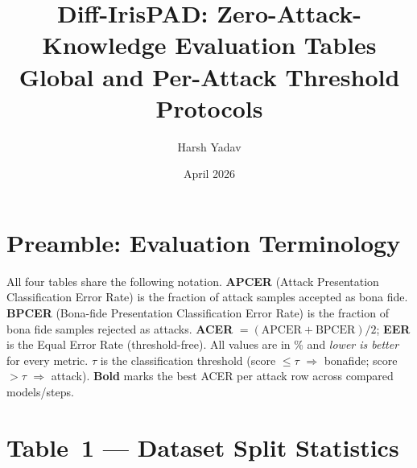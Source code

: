 \documentclass{article}
\title{\textbf{Diff-IrisPAD: Zero-Attack-Knowledge Evaluation Tables}\\
       \large Global and Per-Attack Threshold Protocols}
\author{Harsh Yadav}
\date{April 2026}
\begin{document}
\maketitle

\section*{Preamble: Evaluation Terminology}

\noindent
All four tables share the following notation.
\textbf{APCER} (Attack Presentation Classification Error Rate) is the fraction
of attack samples accepted as bona fide.
\textbf{BPCER} (Bona-fide Presentation Classification Error Rate) is the
fraction of bona fide samples rejected as attacks.
\textbf{ACER} $=(\text{APCER}+\text{BPCER})/2$;
\textbf{EER} is the Equal Error Rate (threshold-free).
All values are in \% and \emph{lower is better} for every metric.
$\tau$ is the classification threshold (score $\le\tau$ $\Rightarrow$ bonafide;
score $>\tau$ $\Rightarrow$ attack).
\textbf{Bold} marks the best ACER per attack row across compared models/steps.

\section*{Table~1 — Dataset Split Statistics}
\end{document}
